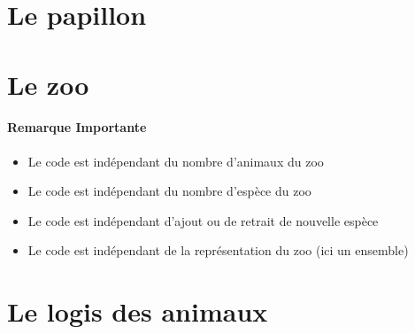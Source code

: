\documentclass{article}
\begin{document}
	\section{Le papillon}
	\begin{center}  \end{center}
		
		
		
	\newpage
		
		
	\newpage
	\section{Le zoo}
		
		
	\paragraph{Remarque Importante} 
	\begin{itemize}
		\item Le code est indépendant du nombre d'animaux du zoo
		\item Le code est indépendant du nombre d'espèce du zoo
		\item Le code est indépendant d'ajout ou de retrait de nouvelle espèce 
		\item Le code est indépendant de la représentation du zoo (ici un ensemble)
	\end{itemize}
	\newpage
	\section{Le logis des animaux}
		
		
		
		
		
\end{document}
